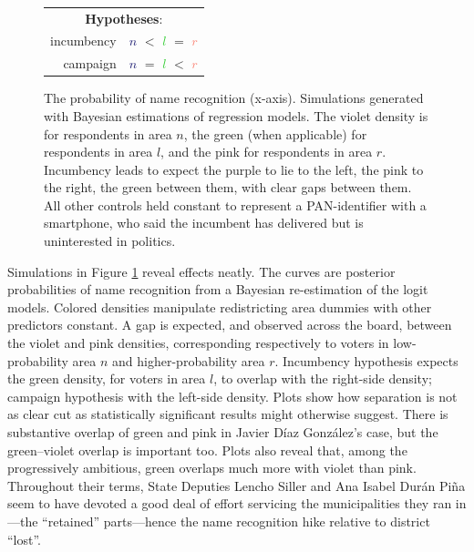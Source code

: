 \documentclass[letter,12pt]{article}
\begin{document}
\begin{figure}
\begin{tabular}{cc}
  \end{tabular}
~ \\ ~ \\ ~ \\
\medskip
\begin{tabular}{|rc|}
  \hline \multicolumn{2}{|c|}{\textbf{Hypotheses}:} \\
  incumbency & \textcolor{MidnightBlue}{$n$} $<$ \textcolor{LimeGreen}{$l$} $=$ \textcolor{Salmon}{$r$} \\
  campaign   & \textcolor{MidnightBlue}{$n$} $=$ \textcolor{LimeGreen}{$l$} $<$ \textcolor{Salmon}{$r$} \\ \hline
\end{tabular}
\medskip
\caption{The probability of name recognition (x-axis). Simulations generated with Bayesian estimations of regression models. The violet density is for respondents in area $n$, the green (when applicable) for respondents in area $l$, and the pink for respondents in area $r$. Incumbency leads to expect the purple to lie to the left, the pink to the right, the green between them, with clear gaps between them. All other controls held constant to represent a PAN-identifier with a smartphone, who said the incumbent has delivered but is uninterested in politics.}\label{f:sims}
\end{figure}

Simulations in Figure \ref{f:sims} reveal effects neatly. The curves are posterior probabilities of name recognition from a Bayesian re-estimation of the logit models. Colored densities manipulate redistricting area dummies with other predictors constant. A gap is expected, and observed across the board, between the violet and pink densities, corresponding respectively to voters in low-probability area $n$ and higher-probability area $r$. Incumbency hypothesis expects the green density, for voters in area $l$, to overlap with the right-side density; campaign hypothesis with the left-side density. Plots show how separation is not as clear cut as statistically significant results might otherwise suggest. There is substantive overlap of green and pink in Javier Díaz González's case, but the green--violet overlap is important too. Plots also reveal that, among the progressively ambitious, green overlaps much more with violet than pink. Throughout their terms, State Deputies Lencho Siller and Ana Isabel Durán Piña seem to have devoted a good deal of effort servicing the municipalities they ran in---the ``retained'' parts---hence the name recognition hike relative to district ``lost''.
\end{document}
